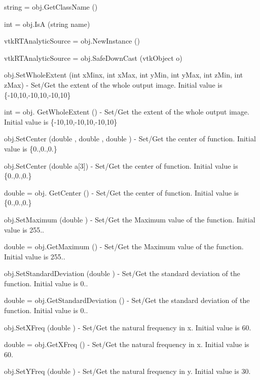 \begin{DoxyItemize}
\item {\ttfamily string = obj.\-Get\-Class\-Name ()}  
\item {\ttfamily int = obj.\-Is\-A (string name)}  
\item {\ttfamily vtk\-R\-T\-Analytic\-Source = obj.\-New\-Instance ()}  
\item {\ttfamily vtk\-R\-T\-Analytic\-Source = obj.\-Safe\-Down\-Cast (vtk\-Object o)}  
\item {\ttfamily obj.\-Set\-Whole\-Extent (int x\-Minx, int x\-Max, int y\-Min, int y\-Max, int z\-Min, int z\-Max)} -\/ Set/\-Get the extent of the whole output image. Initial value is \{-\/10,10,-\/10,10,-\/10,10\}  
\item {\ttfamily int = obj. Get\-Whole\-Extent ()} -\/ Set/\-Get the extent of the whole output image. Initial value is \{-\/10,10,-\/10,10,-\/10,10\}  
\item {\ttfamily obj.\-Set\-Center (double , double , double )} -\/ Set/\-Get the center of function. Initial value is \{0.,0.,0.\}  
\item {\ttfamily obj.\-Set\-Center (double a\mbox{[}3\mbox{]})} -\/ Set/\-Get the center of function. Initial value is \{0.,0.,0.\}  
\item {\ttfamily double = obj. Get\-Center ()} -\/ Set/\-Get the center of function. Initial value is \{0.,0.,0.\}  
\item {\ttfamily obj.\-Set\-Maximum (double )} -\/ Set/\-Get the Maximum value of the function. Initial value is 255..  
\item {\ttfamily double = obj.\-Get\-Maximum ()} -\/ Set/\-Get the Maximum value of the function. Initial value is 255..  
\item {\ttfamily obj.\-Set\-Standard\-Deviation (double )} -\/ Set/\-Get the standard deviation of the function. Initial value is 0..  
\item {\ttfamily double = obj.\-Get\-Standard\-Deviation ()} -\/ Set/\-Get the standard deviation of the function. Initial value is 0..  
\item {\ttfamily obj.\-Set\-X\-Freq (double )} -\/ Set/\-Get the natural frequency in x. Initial value is 60.  
\item {\ttfamily double = obj.\-Get\-X\-Freq ()} -\/ Set/\-Get the natural frequency in x. Initial value is 60.  
\item {\ttfamily obj.\-Set\-Y\-Freq (double )} -\/ Set/\-Get the natural frequency in y. Initial value is 30.  

\end{DoxyItemize}
